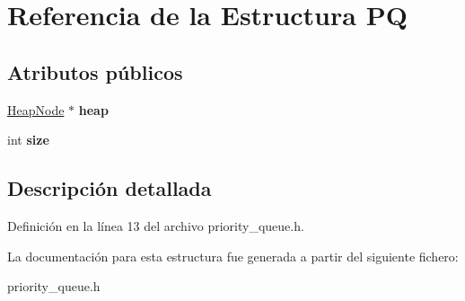\hypertarget{struct_p_q}{}\section{Referencia de la Estructura PQ}
\label{struct_p_q}
\subsection*{Atributos públicos}
\begin{DoxyCompactItemize}
\item 
\mbox{\label{struct_p_q_ab618b21949fcf352a14b591ce66454b4}} 
\hyperlink{structpair}{Heap\+Node} $\ast$ {\bfseries heap}
\item 
\mbox{\label{struct_p_q_a69a5fc1eeab0662cf4ae00a8a68786d8}} 
int {\bfseries size}
\end{DoxyCompactItemize}


\subsection{Descripción detallada}


Definición en la línea 13 del archivo priority\+\_\+queue.\+h.



La documentación para esta estructura fue generada a partir del siguiente fichero\+:\begin{DoxyCompactItemize}
\item 
priority\+\_\+queue.\+h\end{DoxyCompactItemize}
